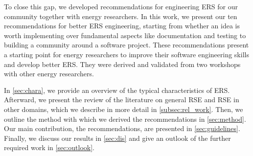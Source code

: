 To close this gap, we developed recommendations for engineering \ac{ERS} for our community together with energy researchers. 
In this work, we present our ten recommendations for better \ac{ERS} engineering, starting from whether an idea is worth implementing over fundamental aspects like documentation and testing to building a community around a software project. These recommendations present a starting point for energy researchers to improve their software engineering skills and develop better \ac{ERS}. They were derived and validated from two workshops with other energy researchers. 

In \autoref{sec:chara}, we provide an overview of the typical characteristics of \ac{ERS}. Afterward, we present the review of the literature on general \ac{RSE} and \ac{RSE} in other domains, which we describe in more detail in \autoref{subsec:rel_work}. Then, we outline the method with which we derived the recommendations in \autoref{sec:method}. Our main contribution, the recommendations, are presented in \autoref{sec:guidelines}. Finally, we discuss our results in \autoref{sec:dis} and give an outlook of the further required work in \autoref{sec:outlook}. 

